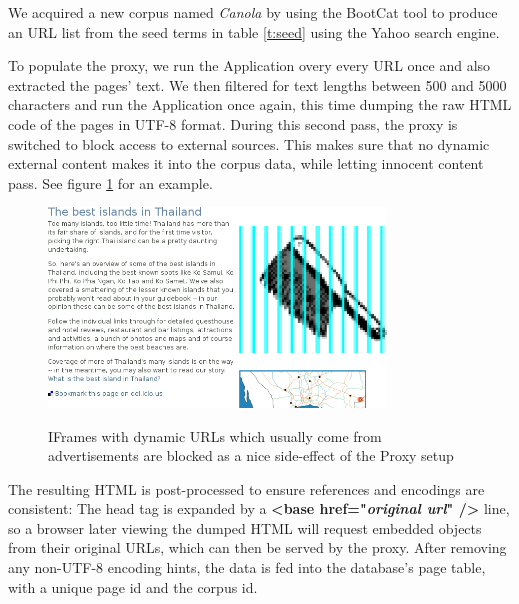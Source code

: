 We acquired a new corpus named \textit{Canola} by using the BootCat tool to produce an URL list from the seed terms in table \ref{t:seed} using the Yahoo search engine. 

To populate the proxy, we run the Application overy every URL once and also extracted the pages' text.
We then filtered for text lengths between 500 and 5000 characters and run the Application once again, this time dumping the raw HTML code of the pages in UTF-8 format.
During this second pass, the proxy is switched to block access to external sources.
This makes sure that no dynamic external content makes it into the corpus data, while letting innocent content pass.
See figure \ref{f:iframes} for an example.

\begin{figure}
	{\includegraphics[width=0.8\textwidth]{add}}
\caption{\label{f:iframes}IFrames with dynamic URLs which usually come from advertisements are blocked as a nice side-effect of the Proxy setup}
\end{figure}

The resulting HTML is post-processed to ensure references and encodings are consistent:
The head tag is expanded by a \textbf{<base href="\textit{original url}" />} line, so a browser later viewing the dumped HTML will request embedded objects from their original URLs, which can then be served by the proxy.
After removing any non-UTF-8 encoding hints, the data is fed into the database's page table, with a unique page id and the corpus id.

